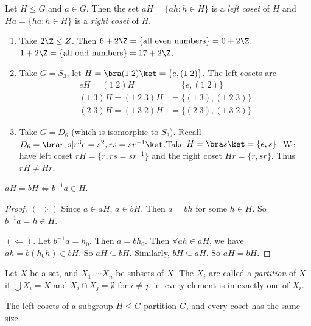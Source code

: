\documentclass[a4paper]{article}
\begin{document}
\begin{defi}[Cosets]
  Let $H\leq G$ and $a\in G$. Then the set $aH =\{ah : h\in H\}$ is a \emph{left coset} of $H$  and $Ha = \{ha : h\in H\}$ is a \emph{right coset} of $H$.
\end{defi}
\begin{eg}\leavevmode
  \begin{enumerate}
    \item Take $2\Z \leq Z$. Then $6 + 2\Z = \{\text{all even numbers}\} = 0 + 2\Z$. $1 + 2\Z = \{\text{all odd numbers}\} = 17 + 2\Z$.
    \item Take $G = S_3$, let $H = \bra (1\; 2)\ket = \{e, (1\; 2)\}$. The left cosets are
      \begin{align*}
        eH = (1\; 2)H &= \{e, (1\; 2)\}\\
        (1\; 3)H = (1\; 2\; 3)H &= \{(1\; 3), (1\; 2\; 3)\}\\
        (2\; 3)H = (1\; 3\; 2)H &= \{(2\; 3), (1\; 3\; 2)\}
      \end{align*}
    \item Take $G = D_6$ (which is isomorphic to $S_3$). Recall $D_6 = \bra r, s | r^3 e = s^2, rs = sr^{-1}\ket$.Take $H = \bra s\ket = \{e, s\}$. We have left coset $rH = \{r, rs = sr^{-1}\}$ and the right coset $Hr = \{r, sr\}$. Thus $rH \not= Hr$.
  \end{enumerate}
\end{eg}

\begin{prop}
  $aH = bH \Leftrightarrow b^{-1}a\in H$.
\end{prop}
\begin{proof}
  $(\Rightarrow)$ Since $a\in aH$, $a\in bH$. Then $a = bh$ for some $h\in H$. So $b^{-1}a = h\in H$.

  $(\Leftarrow)$. Let $b^{-1}a = h_0$. Then $a = bh_0$. Then $\forall ah\in aH$, we have $ah = b(h_0h)\in bH$. So $aH \subseteq bH$. Similarly, $bH\subseteq aH$. So $aH = bH$.
\end{proof}


\begin{defi}[Partition]
  Let $X$ be a set, and $X_1, \cdots X_n$ be subsets of $X$. The $X_i$ are called a \emph{partition} of $X$ if $\bigcup X_i = X$ and $X_i\cap X_j = \emptyset$ for $i\not= j$. ie. every element is in exactly one of $X_i$.
\end{defi}

\begin{lemma}
  The left cosets of a subgroup $H\leq G$ partition $G$, and every coset has the same size.
\end{lemma}
\end{document}
